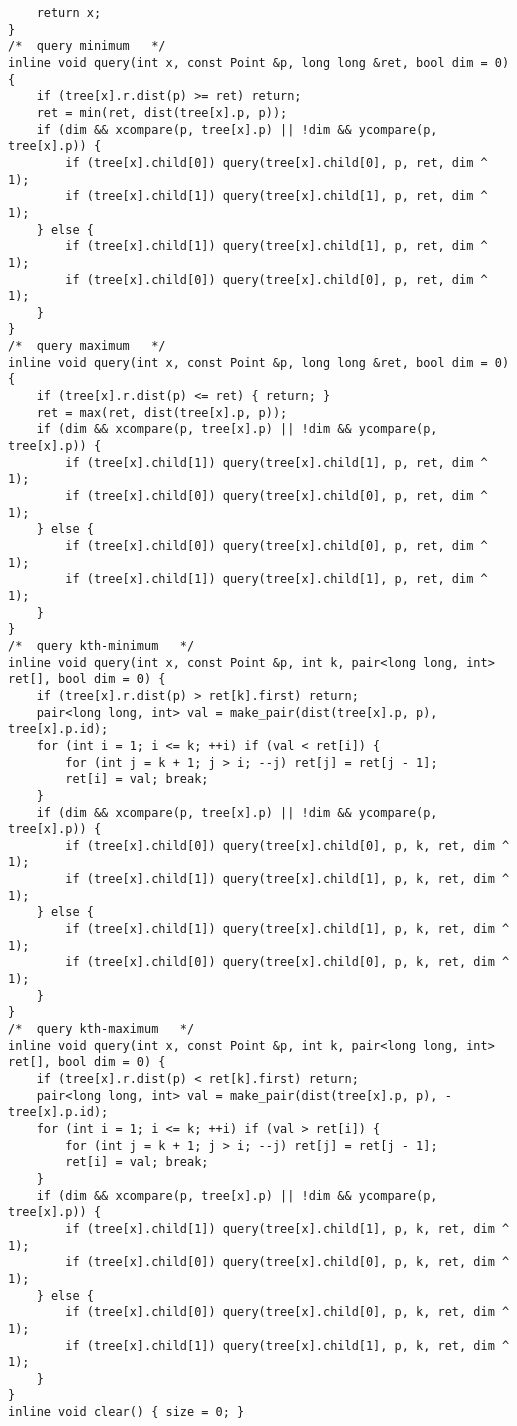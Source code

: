 \begin{lstlisting}
	return x;
}
/*	query minimum	*/
inline void query(int x, const Point &p, long long &ret, bool dim = 0) {
	if (tree[x].r.dist(p) >= ret) return;
	ret = min(ret, dist(tree[x].p, p));
	if (dim && xcompare(p, tree[x].p) || !dim && ycompare(p, tree[x].p)) {
		if (tree[x].child[0]) query(tree[x].child[0], p, ret, dim ^ 1);
		if (tree[x].child[1]) query(tree[x].child[1], p, ret, dim ^ 1);
	} else {
		if (tree[x].child[1]) query(tree[x].child[1], p, ret, dim ^ 1);
		if (tree[x].child[0]) query(tree[x].child[0], p, ret, dim ^ 1);
	}
}
/*	query maximum	*/
inline void query(int x, const Point &p, long long &ret, bool dim = 0) {
	if (tree[x].r.dist(p) <= ret) { return; }
	ret = max(ret, dist(tree[x].p, p));
	if (dim && xcompare(p, tree[x].p) || !dim && ycompare(p, tree[x].p)) {
		if (tree[x].child[1]) query(tree[x].child[1], p, ret, dim ^ 1);
		if (tree[x].child[0]) query(tree[x].child[0], p, ret, dim ^ 1);
	} else {
		if (tree[x].child[0]) query(tree[x].child[0], p, ret, dim ^ 1);
		if (tree[x].child[1]) query(tree[x].child[1], p, ret, dim ^ 1);
	}
}
/*	query kth-minimum	*/
inline void query(int x, const Point &p, int k, pair<long long, int> ret[], bool dim = 0) {
	if (tree[x].r.dist(p) > ret[k].first) return;
	pair<long long, int> val = make_pair(dist(tree[x].p, p), tree[x].p.id);
	for (int i = 1; i <= k; ++i) if (val < ret[i]) {
		for (int j = k + 1; j > i; --j) ret[j] = ret[j - 1];
		ret[i] = val; break;
	}
	if (dim && xcompare(p, tree[x].p) || !dim && ycompare(p, tree[x].p)) {
		if (tree[x].child[0]) query(tree[x].child[0], p, k, ret, dim ^ 1);
		if (tree[x].child[1]) query(tree[x].child[1], p, k, ret, dim ^ 1);
	} else {
		if (tree[x].child[1]) query(tree[x].child[1], p, k, ret, dim ^ 1);
		if (tree[x].child[0]) query(tree[x].child[0], p, k, ret, dim ^ 1);
	}
}
/*	query kth-maximum	*/
inline void query(int x, const Point &p, int k, pair<long long, int> ret[], bool dim = 0) {
	if (tree[x].r.dist(p) < ret[k].first) return;
	pair<long long, int> val = make_pair(dist(tree[x].p, p), -tree[x].p.id);
	for (int i = 1; i <= k; ++i) if (val > ret[i]) {
		for (int j = k + 1; j > i; --j) ret[j] = ret[j - 1];
		ret[i] = val; break;
	}
	if (dim && xcompare(p, tree[x].p) || !dim && ycompare(p, tree[x].p)) {
		if (tree[x].child[1]) query(tree[x].child[1], p, k, ret, dim ^ 1);
		if (tree[x].child[0]) query(tree[x].child[0], p, k, ret, dim ^ 1);
	} else {
		if (tree[x].child[0]) query(tree[x].child[0], p, k, ret, dim ^ 1);
		if (tree[x].child[1]) query(tree[x].child[1], p, k, ret, dim ^ 1);
	}
}
inline void clear() { size = 0; }
\end{lstlisting}